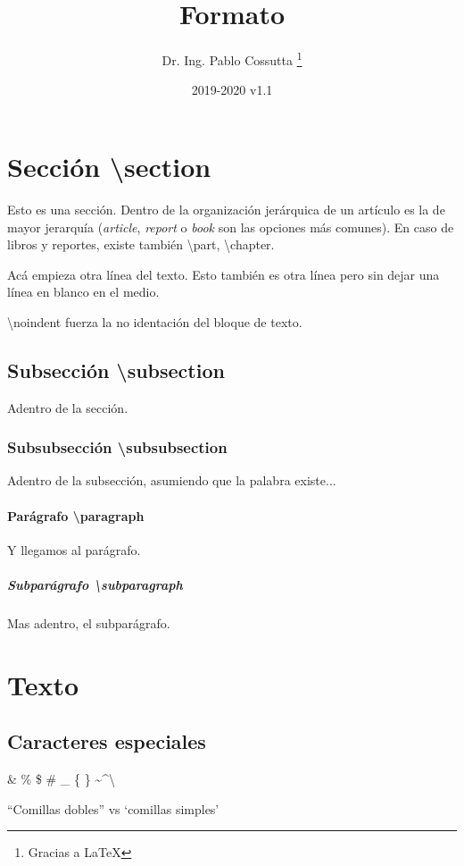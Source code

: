 \documentclass[11pt, a4paper]{article}
\title{Formato}
\author{Dr. Ing. Pablo Cossutta \thanks{Gracias a \LaTeX}}
\date{2019-2020 v1.1}
\begin{document}
\maketitle
\section{Sección \textbackslash section} \label{sec1}
Esto es una sección. Dentro de la organización jerárquica de un artículo es la de mayor jerarquía (\textit{article}, \textit{report} o \textit{book} son las opciones más comunes). En caso de libros y reportes, existe también \textbackslash part, \textbackslash chapter.

Acá empieza otra línea del texto.
Esto también es otra línea pero sin dejar una línea en blanco en el medio. 

\noindent \textbackslash noindent fuerza la no identación del bloque de texto.

\subsection{Subsección \textbackslash subsection}
Adentro de la sección. 

\subsubsection{Subsubsección \textbackslash subsubsection}
Adentro de la subsección, asumiendo que la palabra existe...

\paragraph{Parágrafo \textbackslash paragraph}
Y llegamos al parágrafo.
\subparagraph{Subparágrafo \textbackslash subparagraph}
Mas adentro, el subparágrafo.

\section{Texto}
\subsection{Caracteres especiales}
\& \% \$ \# \_ \{ \} \textasciitilde \textasciicircum \textbackslash

``Comillas dobles'' vs `comillas simples'
\end{document}
